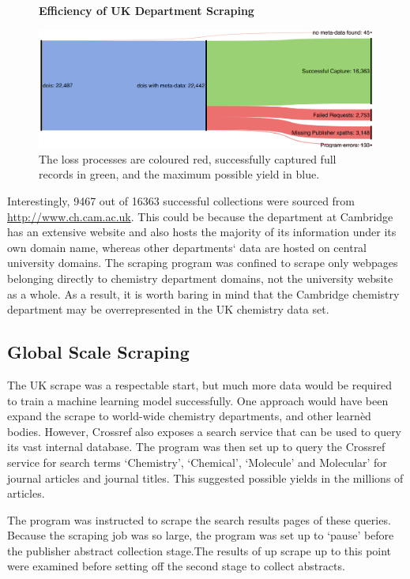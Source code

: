 \begin{figure}[H]
    \centering
    \textbf{Efficiency of UK Department Scraping}\par\medskip
    \includegraphics[width=\textwidth]{Data_Acquisition/uk_sankey.png}
    \caption[Efficiency of UK Department Scraping]{The loss processes are coloured red, successfully captured full records in green, and the maximum possible yield in blue.}
     \label{fig:UKSANK}
\end{figure}

Interestingly, 9467 out of 16363 successful collections were sourced from \url{http://www.ch.cam.ac.uk}. This could be because the department at Cambridge has an extensive website and also hosts the majority of its information under its own domain name, whereas other departments` data are hosted on central university domains. The scraping program was confined to scrape only webpages belonging directly to chemistry department domains, not the university website as a whole. As a result, it is worth baring in mind that the Cambridge chemistry department may be overrepresented in the UK chemistry data set.

\subsection{Global Scale Scraping}
\label{sec:CROSSREFSCRAPE}
The UK scrape was a respectable start, but much more data would be required to train a machine learning model successfully. One approach would have been expand the scrape to world-wide chemistry departments, and other learn\`{e}d bodies. However, Crossref also exposes a search service that can be used to query its vast internal database. The program was then set up to query the Crossref service for search terms `Chemistry', `Chemical', `Molecule' and Molecular' for journal articles and journal titles. This suggested possible yields in the millions of articles. 

The program was instructed to scrape the search results pages of these queries. Because the scraping job was so large, the program was set up to `pause' before the publisher abstract collection stage.The results of up scrape up to this point were examined before setting off the second stage to collect abstracts.

